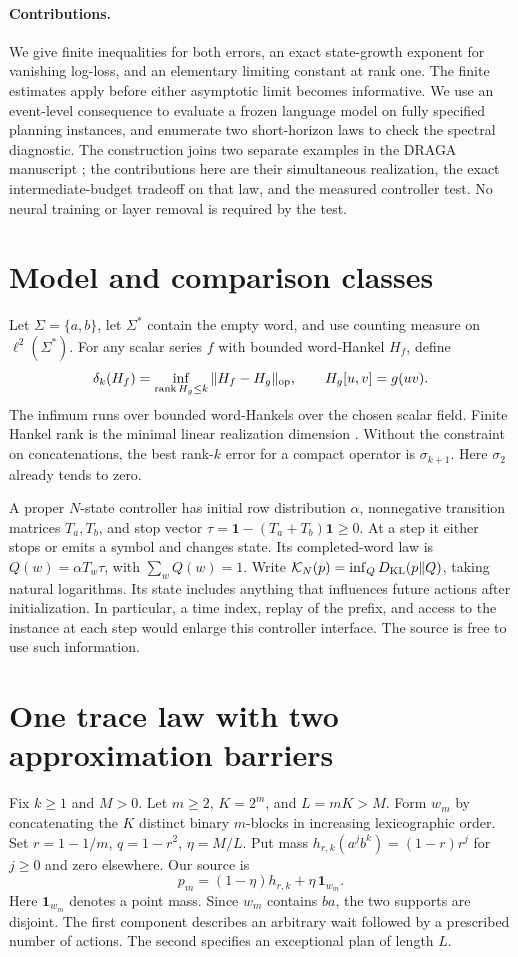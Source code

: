 \paragraph{Contributions.}
We give finite inequalities for both errors, an exact state-growth exponent for vanishing log-loss, and an elementary limiting constant at rank one. The finite estimates apply before either asymptotic limit becomes informative. We use an event-level consequence to evaluate a frozen language model on fully specified planning instances, and enumerate two short-horizon laws to check the spectral diagnostic. The construction joins two separate examples in the DRAGA manuscript \cite{draga}; the contributions here are their simultaneous realization, the exact intermediate-budget tradeoff on that law, and the measured controller test. No neural training or layer removal is required by the test.

\section{Model and comparison classes}\label{sec:model}
Let \(\Sigma=\{a,b\}\), let \(\Sigma^*\) contain the empty word, and use counting measure on \(\ell^2(\Sigma^*)\). For any scalar series \(f\) with bounded word-Hankel \(H_f\), define
\[
 \delta_k(H_f)=\inf_{\operatorname{rank} H_g\le k}\|H_f-H_g\|_{\mathrm{op}},
 \qquad H_g[u,v]=g(uv).
\]
The infimum runs over bounded word-Hankels over the chosen scalar field. Finite Hankel rank is the minimal linear realization dimension \cite{carlyle,fliess}. Without the constraint on concatenations, the best rank-\(k\) error for a compact operator is \(\sigma_{k+1}\). Here \(\sigma_2\) already tends to zero.

A proper \(N\)-state controller has initial row distribution \(\alpha\), nonnegative transition matrices \(T_a,T_b\), and stop vector \(\tau=\mathbf1-(T_a+T_b)\mathbf1\ge0\). At a step it either stops or emits a symbol and changes state. Its completed-word law is \(Q(w)=\alpha T_w\tau\), with \(\sum_w Q(w)=1\). Write \(\mathcal K_N(p)=\inf_QD_{\mathrm{KL}}(p\Vert Q)\), taking natural logarithms. Its state includes anything that influences future actions after initialization. In particular, a time index, replay of the prefix, and access to the instance at each step would enlarge this controller interface. The source is free to use such information.

\section{One trace law with two approximation barriers}\label{sec:joint}
Fix \(k\ge1\) and \(M>0\). Let \(m\ge2\), \(K=2^m\), and \(L=mK>M\). Form \(w_m\) by concatenating the \(K\) distinct binary \(m\)-blocks in increasing lexicographic order. Set \(r=1-1/m\), \(q=1-r^2\), \(\eta=M/L\). Put mass \(h_{r,k}(a^j b^k)=(1-r)r^j\) for \(j\ge0\) and zero elsewhere. Our source is
\[
                 p_m=(1-\eta)h_{r,k}+\eta\,\mathbf{1}_{w_m}.
\]
Here \(\mathbf{1}_{w_m}\) denotes a point mass. Since \(w_m\) contains \(ba\), the two supports are disjoint. The first component describes an arbitrary wait followed by a prescribed number of actions. The second specifies an exceptional plan of length \(L\).


